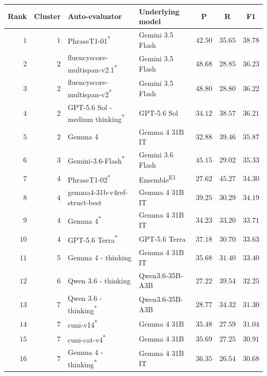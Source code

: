 \begin{table}[t]
\centering
\small
\begin{tabular}{rrllrrr}
\toprule
\multicolumn{1}{c}{Rank} & \multicolumn{1}{c}{Cluster} & Auto-evaluator & Underlying model & \multicolumn{1}{c}{P} & \multicolumn{1}{c}{R} & \multicolumn{1}{c}{F1} \\
\midrule
$1$ & $1$ & PhraseT1-01\textsuperscript{*} & Gemini 3.5 Flash & $42.50$ & $35.65$ & $38.78$ \\
$2$ & $2$ & fluencyscore-multispan-v2.1\textsuperscript{*} & Gemini 3.5 Flash & $48.68$ & $28.85$ & $36.23$ \\
$3$ & $2$ & fluencyscore-multispan-v2\textsuperscript{*} & Gemini 3.5 Flash & $48.80$ & $28.80$ & $36.22$ \\
\rowcolor{black!15} $4$ & $2$ & GPT-5.6 Sol - medium thinking\textsuperscript{*} & GPT-5.6 Sol & $34.12$ & $38.57$ & $36.21$ \\
\rowcolor{black!15} $5$ & $2$ & Gemma 4 & Gemma 4 31B IT & $32.88$ & $39.46$ & $35.87$ \\
\rowcolor{black!15} $6$ & $3$ & Gemini-3.6-Flash\textsuperscript{*} & Gemini 3.6 Flash & $45.15$ & $29.02$ & $35.33$ \\
$7$ & $4$ & PhraseT1-02\textsuperscript{*} & Ensemble\textsuperscript{E1} & $27.62$ & $45.27$ & $34.30$ \\
$8$ & $4$ & gemma4-31b-v4ref-struct-best & Gemma 4 31B IT & $39.25$ & $30.29$ & $34.19$ \\
\rowcolor{black!15} $9$ & $4$ & Gemma 4\textsuperscript{*} & Gemma 4 31B IT & $34.23$ & $33.20$ & $33.71$ \\
\rowcolor{black!15} $10$ & $4$ & GPT-5.6 Terra\textsuperscript{*} & GPT-5.6 Terra & $37.18$ & $30.70$ & $33.63$ \\
\rowcolor{black!15} $11$ & $5$ & Gemma 4 - thinking & Gemma 4 31B IT & $35.68$ & $31.40$ & $33.40$ \\
\rowcolor{black!15} $12$ & $6$ & Qwen 3.6 - thinking & Qwen3.6-35B-A3B & $27.22$ & $39.54$ & $32.25$ \\
\rowcolor{black!15} $13$ & $7$ & Qwen 3.6 - thinking\textsuperscript{*} & Qwen3.6-35B-A3B & $28.77$ & $34.32$ & $31.30$ \\
$14$ & $7$ & cuni-v14\textsuperscript{*} & Gemma 4 31B & $35.48$ & $27.59$ & $31.04$ \\
$15$ & $7$ & cuni-cat-v4\textsuperscript{*} & Gemma 4 31B & $35.69$ & $27.25$ & $30.91$ \\
\rowcolor{black!15} $16$ & $7$ & Gemma 4 - thinking\textsuperscript{*} & Gemma 4 31B IT & $36.35$ & $26.54$ & $30.68$ \\

\end{tabular}
\end{table}
